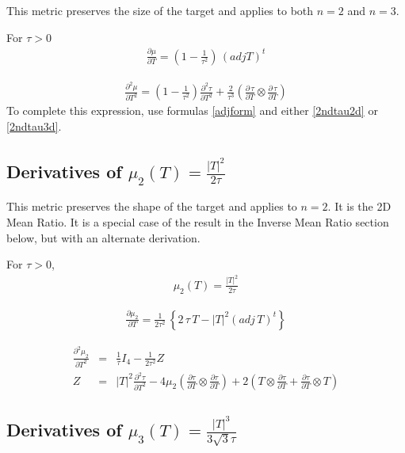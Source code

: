 \documentclass{report}
\begin{document}
\noindent This metric preserves the size of the target and applies
to both $n=2$ and $n=3$. \newline

\noindent For $\tau>0$
\begin{eqnarray}
\frac{\partial \mu}{\partial T} = \left( 1 - \frac{1}{\tau^2} \right) \, (adj T)^t
\end{eqnarray}

\begin{eqnarray}
\frac{\partial^2 \mu}{\partial T^2} = \left( 1 - \frac{1}{\tau^2} \right) \frac{\partial^2 \tau}{\partial T^2} + \frac{2}{\tau^3} \left( \frac{\partial \, \tau}{\partial T} \otimes \frac{\partial \, \tau}{\partial T} \right)
\end{eqnarray}
To complete this expression, use formulas \ref{adjform} and either 
\ref{2ndtau2d} or \ref{2ndtau3d}. \newline

\subsection{Derivatives of $\mu_2(T) = \frac{|T|^2}{2 \tau}$}

\noindent This metric preserves the shape of the target and applies
to $n=2$. It is the 2D Mean Ratio. It is a special case of the result
in the Inverse Mean Ratio section below, but with an alternate derivation. \newline

\noindent For $\tau>0$,
\begin{eqnarray}
\mu_2(T) = \frac{|T|^2}{2 \tau}
\end{eqnarray}

\begin{eqnarray}
\frac{\partial \mu_2}{\partial T} = \frac{1}{2 \tau^2} \, \left\{ 2 \, \tau \, T - |T|^2 (adj \, T)^t \right\}
\end{eqnarray}

\begin{eqnarray}
\frac{\partial^2 \mu_2}{\partial T^2} & = & \frac{1}{\tau} I_4 - \frac{1}{2 \tau^2} Z \\
Z & = & |T|^2 \frac{\partial^2 \tau}{\partial T^2} - 4 \mu_2 \left(\frac{\partial \tau}{\partial T} \otimes \frac{\partial \tau}{\partial T} \right) + 2 \left( T \otimes \frac{\partial \tau}{\partial T} + \frac{\partial \tau}{\partial T} \otimes T \right)
\end{eqnarray}

\subsection{Derivatives of $\mu_3(T)=\frac{|T|^3}{3 \sqrt{3} \tau}$}
\end{document}

